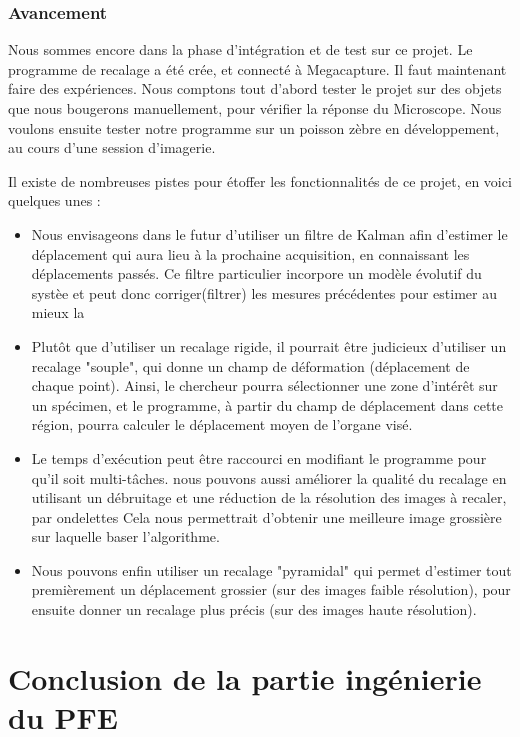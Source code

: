 \subsubsection{Avancement}

Nous sommes encore dans la phase d'intégration et de test sur ce projet.
Le programme de recalage a été crée, et connecté à Megacapture.
Il faut maintenant faire des expériences. Nous comptons tout d'abord tester le projet
sur des objets que nous bougerons manuellement, pour vérifier la réponse du Microscope.
Nous voulons ensuite tester notre programme sur un poisson zèbre en développement, au cours d'une session d'imagerie.

Il existe de nombreuses pistes pour étoffer les fonctionnalités de ce projet, en voici quelques unes :
\begin{itemize}
  \item Nous envisageons dans le futur d'utiliser un filtre de Kalman afin d'estimer
  le déplacement qui aura lieu à la prochaine acquisition, en connaissant les déplacements passés. Ce filtre particulier incorpore un modèle évolutif du systèe et peut donc corriger(filtrer) les mesures précédentes pour estimer au mieux la 
  \item Plutôt que d'utiliser un recalage rigide, il pourrait être judicieux d'utiliser un recalage "souple",
  qui donne un champ de déformation (déplacement de chaque point).
  Ainsi, le chercheur pourra sélectionner une zone d'intérêt sur un spécimen,
  et le programme, à partir du champ de déplacement dans cette région, pourra calculer
  le déplacement moyen de l'organe visé.
  \item Le temps d'exécution peut être raccourci en modifiant le programme pour qu'il soit multi-tâches.
  nous pouvons aussi améliorer la qualité du recalage en utilisant un débruitage et une réduction de la résolution
  des images à recaler, par ondelettes
  Cela nous permettrait d'obtenir une meilleure image grossière sur laquelle baser l'algorithme.
  \item Nous pouvons enfin utiliser un recalage "pyramidal" qui permet d'estimer tout premièrement un déplacement
  grossier (sur des images faible résolution), pour ensuite donner un recalage plus précis (sur des images haute résolution).
\end{itemize}


\section{Conclusion de la partie ingénierie du PFE}

